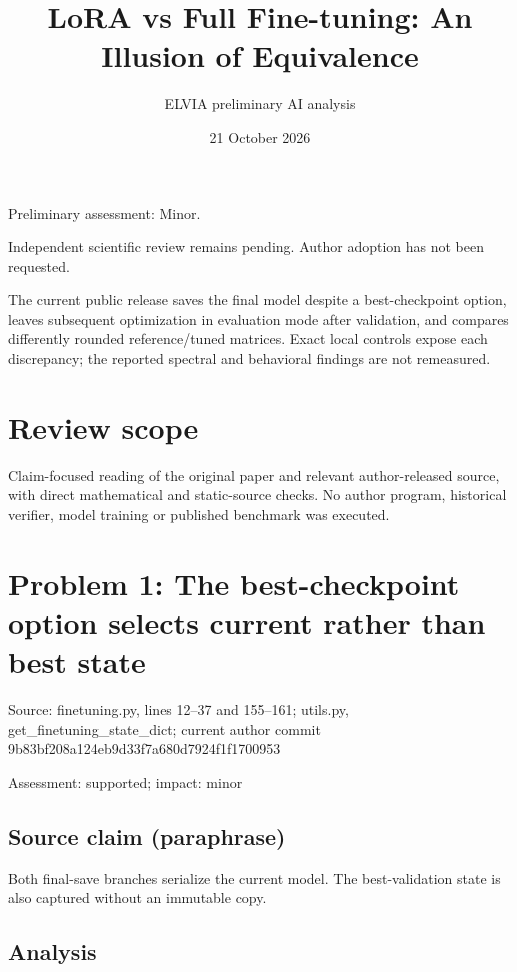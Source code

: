 \documentclass[11pt]{article}
\begin{document}
\title{LoRA vs Full Fine-tuning: An Illusion of Equivalence}

\author{ELVIA preliminary AI analysis}\date{21 October 2026}\maketitle

Preliminary assessment: Minor.\par

Independent scientific review remains pending. Author adoption has not been requested.

The current public release saves the final model despite a best-checkpoint option, leaves subsequent optimization in evaluation mode after validation, and compares differently rounded reference/tuned matrices. Exact local controls expose each discrepancy; the reported spectral and behavioral findings are not remeasured.

\section*{Review scope}

Claim-focused reading of the original paper and relevant author-released source, with direct mathematical and static-source checks. No author program, historical verifier, model training or published benchmark was executed.

\section*{Problem 1: The best-checkpoint option selects current rather than best state}

Source: finetuning.py, lines 12–37 and 155–161; utils.py, get\_finetuning\_state\_dict; current author commit 9b83bf208a124eb9d33f7a680d7924f1f1700953

Assessment: supported; impact: minor

\subsection*{Source claim (paraphrase)}

Both final-save branches serialize the current model. The best-validation state is also captured without an immutable copy.

\subsection*{Analysis}
\end{document}

